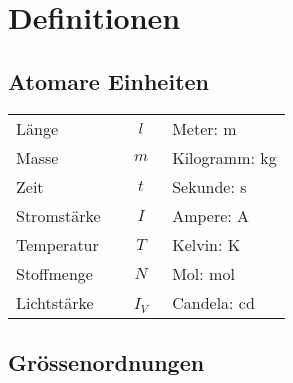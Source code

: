 \section{Definitionen}

\subsection{Atomare Einheiten}
\settowidth{\MyLenA}{Temperatur~~}
\begin{tabular}{lcl}

	Länge 		& $l$ & Meter: \si{\metre} \\
	Masse 		& $m$ & Kilogramm: \si{\kilogram}\\
	Zeit		& $t$ & Sekunde: \si{\second}\\
	Stromstärke 	& $I$ & Ampere: \si{\ampere}\\
	Temperatur	& $T$ & Kelvin: \si{\kelvin}\\
	Stoffmenge	& $N$ & Mol: \si{\mol}\\
	Lichtstärke~~	& ~$I_V$~ & Candela: \si{\candela}\\
\end{tabular}



\subsection{Grössenordnungen}
